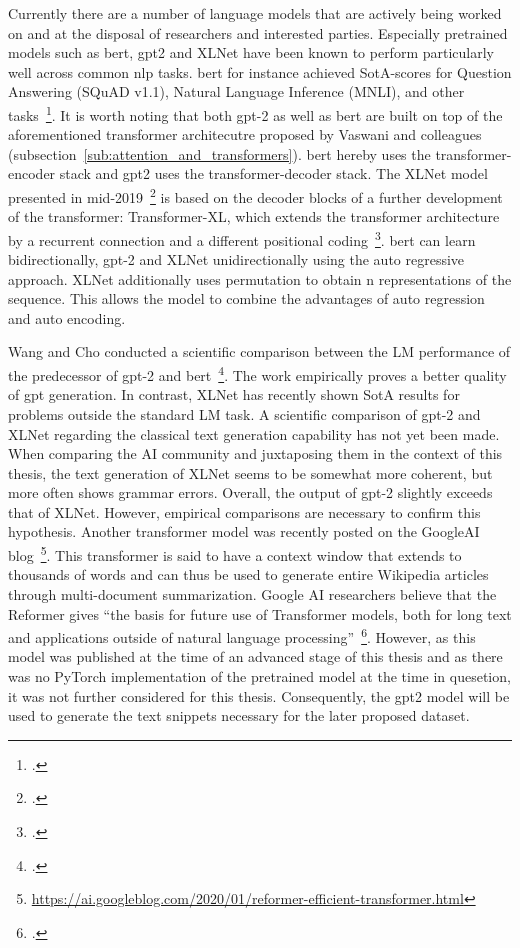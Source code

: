 Currently there are a number of language models that are actively being worked on and at the disposal of researchers and interested parties. Especially pretrained models such as \gls{bert}, \gls{gpt2} and XLNet have been known to perform particularly well across common \gls{nlp} tasks. \gls{bert} for instance achieved SotA-scores for Question Answering (SQuAD v1.1), Natural Language Inference (MNLI), and other tasks~\footcite{DBLP:journals/corr/abs-1810-04805}. It is worth noting that both \gls{gpt}-2 as well as \gls{bert} are built on top of the aforementioned transformer architecutre proposed by Vaswani and colleagues (subsection~\ref{sub:attention_and_transformers}). \gls{bert} hereby uses the transformer-encoder stack and \gls{gpt2} uses the transformer-decoder stack. The XLNet model presented in mid-2019~\footcite{DBLP:journals/corr/abs-1906-08237} is based on the decoder blocks of a further development of the transformer: Transformer-XL, which extends the transformer architecture by a recurrent connection and a different positional coding~\footcite{DBLP:journals/corr/abs-1901-02860}. \gls{bert} can learn bidirectionally, \gls{gpt}-2 and XLNet unidirectionally using the auto regressive approach. XLNet additionally uses permutation to obtain n representations of the sequence. This allows the model to combine the advantages of auto regression and auto encoding.

Wang and Cho conducted a scientific comparison between the LM performance of the predecessor of \gls{gpt}-2 and \gls{bert}~\footcite{wang2019bert}. The work empirically proves a better quality of \gls{gpt} generation. In contrast, XLNet has recently shown SotA results for problems outside the standard LM task. A scientific comparison of \gls{gpt}-2 and XLNet regarding the classical text generation capability has not yet been made. When comparing the AI community and juxtaposing them in the context of this thesis, the text generation of XLNet seems to be somewhat more coherent, but more often shows grammar errors. Overall, the output of \gls{gpt}-2 slightly exceeds that of XLNet. However, empirical comparisons are necessary to confirm this hypothesis. Another transformer model was recently posted on the GoogleAI blog~\footnote{\url{https://ai.googleblog.com/2020/01/reformer-efficient-transformer.html}}. This transformer is said to have a context window that extends to thousands of words and can thus be used to generate entire Wikipedia articles through multi-document summarization. Google AI researchers believe that the Reformer gives ``the basis for future use of Transformer models, both for long text and applications outside of natural language processing''~\footcite{kitaev2020reformer}. However, as this model was published at the time of an advanced stage of this thesis and as there was no PyTorch implementation of the pretrained model at the time in quesetion, it was not further considered for this thesis. Consequently, the \gls{gpt2} model will be used to generate the text snippets necessary for the later proposed dataset.
